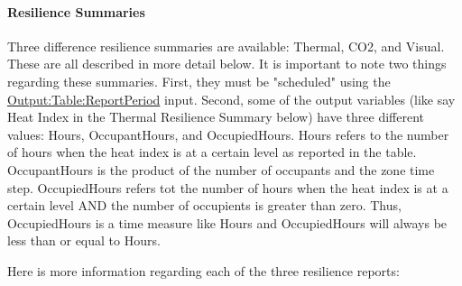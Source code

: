 \paragraph{Resilience Summaries}\label{resilience-summaries}

Three difference resilience summaries are available: Thermal, CO2, and Visual. These are all described in more detail below. It is important to note two things regarding these summaries.  First, they must be "scheduled" using the \hyperref[outputtablereportperiod]{Output:Table:ReportPeriod} input. Second, some of the output variables (like say Heat Index in the Thermal Resilience Summary below) have three different values: Hours, OccupantHours, and OccupiedHours. Hours refers to the number of hours when the heat index is at a certain level as reported in the table.  OccupantHours is the product of the number of occupants and the zone time step.  OccupiedHours refers tot the number of hours when the heat index is at a certain level AND the number of occupients is greater than zero.  Thus, OccupiedHours is a time measure like Hours and OccupiedHours will always be less than or equal to Hours.

Here is more information regarding each of the three resilience reports:

